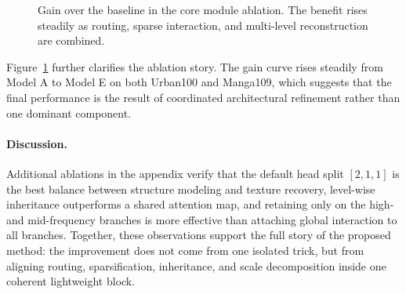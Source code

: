 \begin{table}[t]
\centering
\caption{Effect of dynamic focus ratio \(r\) under \(\times4\). Adaptive sparsification achieves the best accuracy-efficiency trade-off by reserving denser interaction for purer subgroups and pruning mixed ones more aggressively.}
\label{tab:ablation-ratio}
\end{table}

\begin{figure}[t]
\centering

\caption{Gain over the baseline in the core module ablation. The benefit rises steadily as routing, sparse interaction, and multi-level reconstruction are combined.}
\label{fig:ablation-gains}
\end{figure}

Figure~\ref{fig:ablation-gains} further clarifies the ablation story. The gain curve rises steadily from Model A to Model E on both Urban100 and Manga109, which suggests that the final performance is the result of coordinated architectural refinement rather than one dominant component.

\paragraph{Discussion.}
Additional ablations in the appendix verify that the default head split \([2,1,1]\) is the best balance between structure modeling and texture recovery, level-wise inheritance outperforms a shared attention map, and retaining \irca{} only on the high- and mid-frequency branches is more effective than attaching global interaction to all branches. Together, these observations support the full story of the proposed method: the improvement does not come from one isolated trick, but from aligning routing, sparsification, inheritance, and scale decomposition inside one coherent lightweight block.
